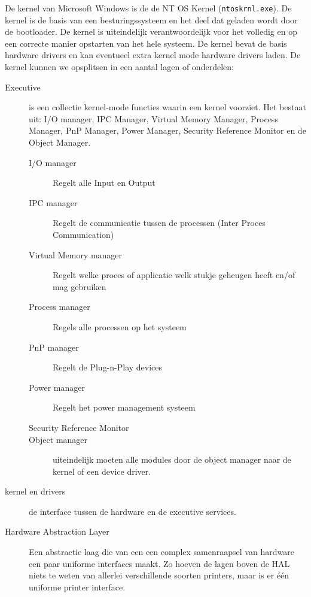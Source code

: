 De kernel van Microsoft Windows is de de NT OS Kernel (\texttt{ntoskrnl.exe}). De kernel is de basis van een besturingssysteem en het deel dat geladen wordt door de bootloader. De kernel is uiteindelijk verantwoordelijk voor het volledig en op een correcte manier opstarten van het hele systeem. De kernel bevat de basis hardware drivers en kan eventueel extra kernel mode hardware drivers laden. De kernel kunnen we opsplitsen in een aantal lagen of onderdelen:
\begin{description}
\item[Executive] is een collectie kernel-mode functies waarin een kernel voorziet. Het bestaat uit: I/O manager, IPC Manager, Virtual Memory Manager, Process Manager, PnP Manager, Power Manager, Security Reference Monitor en de Object Manager.
	\begin{description}
	\item[I/O manager] Regelt alle Input en Output
	\item[IPC manager] Regelt de communicatie tussen de processen (Inter Proces Communication)
	\item[Virtual Memory manager] Regelt welke proces of applicatie welk stukje geheugen heeft en/of mag gebruiken
	\item[Process manager] Regels alle processen op het systeem
	\item[PnP manager] Regelt de Plug-n-Play devices
	\item[Power manager] Regelt het power management systeem
	\item[Security Reference Monitor]
	\item[Object manager] uiteindelijk moeten alle modules door de object manager naar de kernel of een device driver.
	\end{description}
\item[kernel en drivers] de interface tussen de hardware en de executive services.
\item[Hardware Abstraction Layer] Een abstractie laag die van een een complex samenraapsel van hardware een paar uniforme interfaces maakt. Zo hoeven de lagen boven de HAL niets te weten van allerlei verschillende soorten printers, maar is er \'e\'en uniforme printer interface.
\end{description}

